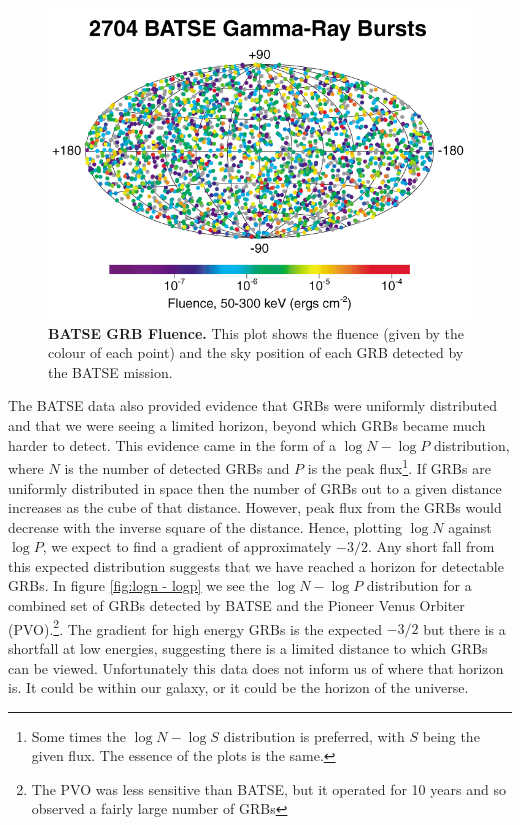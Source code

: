 \documentclass[11pt]{cuthesis}
\begin{document}
\begin{figure} %
\begin{center}
\includegraphics[width=0.8\linewidth]{batse_grbs_fluence.jpg}
\end{center}
\caption{\textbf{BATSE GRB Fluence.} This plot shows the fluence (given by the colour of each point) and the sky position of each GRB detected by the BATSE mission. \cite{BATSE_dist} }
\label{fig:batse grb fluence}
\end{figure}

The BATSE data also provided evidence that GRBs were uniformly distributed and that we were seeing a limited horizon, beyond which GRBs became much harder to detect. This evidence came in the form of a $\log N - \log P$ distribution, where $N$ is the number of detected GRBs and $P$ is the peak flux\footnote{Some times the $\log N - \log S$ distribution is preferred, with $S$ being the given flux. The essence of the plots is the same.}. If GRBs are uniformly distributed in space then the number of GRBs out to a given distance increases as the cube of that distance. However, peak flux from the GRBs would decrease with the inverse square of the distance. Hence, plotting  $\log N$ against $\log P$, we expect to find a gradient of approximately $-3/2$. Any short fall from this expected distribution suggests that we have reached a horizon for detectable GRBs. In figure \ref{fig:logn - logp} we see the $\log N - \log P$ distribution for a combined set of GRBs detected by BATSE and the Pioneer Venus Orbiter (PVO).\footnote{ The PVO was less sensitive than BATSE, but it operated for 10 years and so observed a fairly large number of GRBs}. The gradient for high energy GRBs is the expected $-3/2$ but there is a shortfall at low energies, suggesting there is a limited distance to which GRBs can be viewed. Unfortunately this data does not inform us of where that horizon is. It could be within our galaxy, or it could be the horizon of the universe.   
\end{document}
